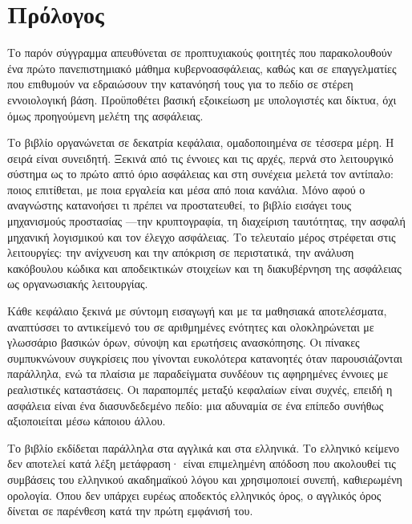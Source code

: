 \chapter*{Πρόλογος}

Το παρόν σύγγραμμα απευθύνεται σε προπτυχιακούς φοιτητές που παρακολουθούν ένα πρώτο πανεπιστημιακό μάθημα κυβερνοασφάλειας, καθώς και σε επαγγελματίες που επιθυμούν να εδραιώσουν την κατανόησή τους για το πεδίο σε στέρεη εννοιολογική βάση. Προϋποθέτει βασική εξοικείωση με υπολογιστές και δίκτυα, όχι όμως προηγούμενη μελέτη της ασφάλειας.

Το βιβλίο οργανώνεται σε δεκατρία κεφάλαια, ομαδοποιημένα σε τέσσερα μέρη. Η σειρά είναι συνειδητή. Ξεκινά από τις έννοιες και τις αρχές, περνά στο λειτουργικό σύστημα ως το πρώτο απτό όριο ασφάλειας και στη συνέχεια μελετά τον αντίπαλο: ποιος επιτίθεται, με ποια εργαλεία και μέσα από ποια κανάλια. Μόνο αφού ο αναγνώστης κατανοήσει τι πρέπει να προστατευθεί, το βιβλίο εισάγει τους μηχανισμούς προστασίας —την κρυπτογραφία, τη διαχείριση ταυτότητας, την ασφαλή μηχανική λογισμικού και τον έλεγχο ασφάλειας. Το τελευταίο μέρος στρέφεται στις λειτουργίες: την ανίχνευση και την απόκριση σε περιστατικά, την ανάλυση κακόβουλου κώδικα και αποδεικτικών στοιχείων και τη διακυβέρνηση της ασφάλειας ως οργανωσιακής λειτουργίας.

Κάθε κεφάλαιο ξεκινά με σύντομη εισαγωγή και με τα μαθησιακά αποτελέσματα, αναπτύσσει το αντικείμενό του σε αριθμημένες ενότητες και ολοκληρώνεται με γλωσσάριο βασικών όρων, σύνοψη και ερωτήσεις ανασκόπησης. Οι πίνακες συμπυκνώνουν συγκρίσεις που γίνονται ευκολότερα κατανοητές όταν παρουσιάζονται παράλληλα, ενώ τα πλαίσια με παραδείγματα συνδέουν τις αφηρημένες έννοιες με ρεαλιστικές καταστάσεις. Οι παραπομπές μεταξύ κεφαλαίων είναι συχνές, επειδή η ασφάλεια είναι ένα διασυνδεδεμένο πεδίο: μια αδυναμία σε ένα επίπεδο συνήθως αξιοποιείται μέσω κάποιου άλλου.

Το βιβλίο εκδίδεται παράλληλα στα αγγλικά και στα ελληνικά. Το ελληνικό κείμενο δεν αποτελεί κατά λέξη μετάφραση· είναι επιμελημένη απόδοση που ακολουθεί τις συμβάσεις του ελληνικού ακαδημαϊκού λόγου και χρησιμοποιεί συνεπή, καθιερωμένη ορολογία. Όπου δεν υπάρχει ευρέως αποδεκτός ελληνικός όρος, ο αγγλικός όρος δίνεται σε παρένθεση κατά την πρώτη εμφάνισή του.
